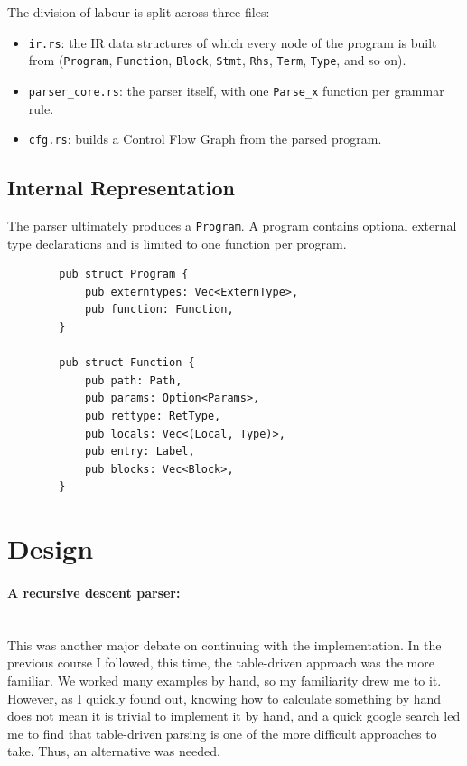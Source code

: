 \documentclass[11pt,a4paper,oneside]{report}
\begin{document}
	The division of labour is split across three files:
	
	\begin{itemize}
		\item \texttt{ir.rs}: the IR data structures of which every node of the program is built from (\texttt{Program}, \texttt{Function}, \texttt{Block}, \texttt{Stmt}, \texttt{Rhs}, \texttt{Term}, \texttt{Type}, and so on).
		\item \texttt{parser\_core.rs}: the parser itself, with one \texttt{Parse\_x} function per grammar rule. 
		\item \texttt{cfg.rs}: builds a Control Flow Graph from the parsed program. 
	\end{itemize}
	
	\subsection{Internal Representation}
	The parser ultimately produces a \texttt{Program}. A program contains optional external type declarations and is limited to one function per program. 
	
	\begin{lstlisting}
		pub struct Program {
			pub externtypes: Vec<ExternType>,
			pub function: Function,
		}
		
		pub struct Function {
			pub path: Path,
			pub params: Option<Params>,
			pub rettype: RetType,
			pub locals: Vec<(Local, Type)>,
			pub entry: Label,
			pub blocks: Vec<Block>,
		}
	\end{lstlisting}
	

	\section{Design}
	\paragraph{A recursive descent parser:}\mbox{}\\
	
	This was another major debate on continuing with the implementation. In the previous course I followed, this time, the table-driven approach was the more familiar. We worked many examples by hand, so my familiarity drew me to it. However, as I quickly found out, knowing how to calculate something by hand does not mean it is trivial to implement it by hand, and a quick google search led me to find that table-driven parsing is one of the more difficult approaches to take. Thus, an alternative was needed. 
	
\end{document}
